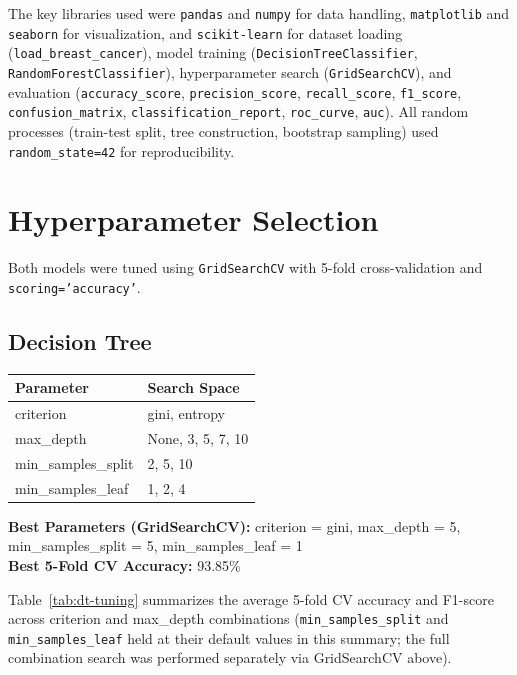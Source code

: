 \documentclass[12pt,a4paper]{article}
\begin{document}
\vspace{0.3cm}
The key libraries used were \texttt{pandas} and \texttt{numpy} for data handling, \texttt{matplotlib} and \texttt{seaborn} for visualization, and \texttt{scikit-learn} for dataset loading (\texttt{load\_breast\_cancer}), model training (\texttt{DecisionTreeClassifier}, \texttt{RandomForestClassifier}), hyperparameter search (\texttt{GridSearchCV}), and evaluation (\texttt{accuracy\_score}, \texttt{precision\_score}, \texttt{recall\_score}, \texttt{f1\_score}, \texttt{confusion\_matrix}, \texttt{classification\_report}, \texttt{roc\_curve}, \texttt{auc}). All random processes (train-test split, tree construction, bootstrap sampling) used \texttt{random\_state=42} for reproducibility.

\section{Hyperparameter Selection}

Both models were tuned using \texttt{GridSearchCV} with 5-fold cross-validation and \texttt{scoring='accuracy'}.

\subsection{Decision Tree}
\begin{tabular}{ll}
\toprule
Parameter & Search Space\\
\midrule
criterion & gini, entropy \\
max\_depth & None, 3, 5, 7, 10 \\
min\_samples\_split & 2, 5, 10 \\
min\_samples\_leaf & 1, 2, 4 \\
\bottomrule
\end{tabular}

\vspace{0.3cm}
\textbf{Best Parameters (GridSearchCV):} criterion = gini, max\_depth = 5, min\_samples\_split = 5, min\_samples\_leaf = 1 \\
\textbf{Best 5-Fold CV Accuracy:} 93.85\%

\vspace{0.3cm}
Table~\ref{tab:dt-tuning} summarizes the average 5-fold CV accuracy and F1-score across criterion and max\_depth combinations (\texttt{min\_samples\_split} and \texttt{min\_samples\_leaf} held at their default values in this summary; the full combination search was performed separately via GridSearchCV above).
\end{document}
